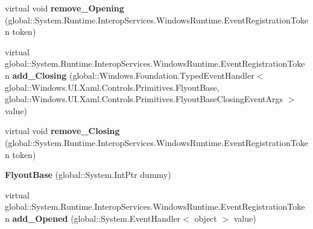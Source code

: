 \begin{DoxyCompactItemize}
\item 
\mbox{\label{class_windows_1_1_u_i_1_1_xaml_1_1_controls_1_1_primitives_1_1_flyout_base_a24e892a50720e9b950a86332383a641c}} 
virtual void {\bfseries remove\+\_\+\+Opening} (global\+::\+System.\+Runtime.\+Interop\+Services.\+Windows\+Runtime.\+Event\+Registration\+Token token)
\item 
\mbox{\label{class_windows_1_1_u_i_1_1_xaml_1_1_controls_1_1_primitives_1_1_flyout_base_a048b76cc08a938c4371b9bc74777d73a}} 
virtual global\+::\+System.\+Runtime.\+Interop\+Services.\+Windows\+Runtime.\+Event\+Registration\+Token {\bfseries add\+\_\+\+Closing} (global\+::\+Windows.\+Foundation.\+Typed\+Event\+Handler$<$ global\+::\+Windows.\+U\+I.\+Xaml.\+Controls.\+Primitives.\+Flyout\+Base, global\+::\+Windows.\+U\+I.\+Xaml.\+Controls.\+Primitives.\+Flyout\+Base\+Closing\+Event\+Args $>$ value)
\item 
\mbox{\label{class_windows_1_1_u_i_1_1_xaml_1_1_controls_1_1_primitives_1_1_flyout_base_a3d2a27eaf9daaa9e54e906ae772bc53b}} 
virtual void {\bfseries remove\+\_\+\+Closing} (global\+::\+System.\+Runtime.\+Interop\+Services.\+Windows\+Runtime.\+Event\+Registration\+Token token)
\item 
\mbox{\label{class_windows_1_1_u_i_1_1_xaml_1_1_controls_1_1_primitives_1_1_flyout_base_aa5806d40967d26c2011e0427640dd885}} 
{\bfseries Flyout\+Base} (global\+::\+System.\+Int\+Ptr dummy)
\item 
\mbox{\label{class_windows_1_1_u_i_1_1_xaml_1_1_controls_1_1_primitives_1_1_flyout_base_a897348c50b44a1e97d0d95c49c1bd853}} 
virtual global\+::\+System.\+Runtime.\+Interop\+Services.\+Windows\+Runtime.\+Event\+Registration\+Token {\bfseries add\+\_\+\+Opened} (global\+::\+System.\+Event\+Handler$<$ object $>$ value)
\item 
\mbox{\label{class_windows_1_1_u_i_1_1_xaml_1_1_controls_1_1_primitives_1_1_flyout_base_a4bd2f94eb6ae77227752ea52d9497eb1}} 

\end{DoxyCompactItemize}
